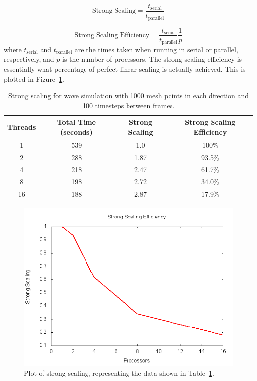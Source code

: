 \documentclass[12pt]{article}
\begin{document}
\begin{equation}
\mathrm{Strong \; Scaling} = \frac{t_{\mathrm{serial}}}{t_{\mathrm{parallel}}}
\label{strongscale}
\end{equation}

\begin{equation}
\mathrm{Strong \; Scaling \; Efficiency} = \frac{t_{\mathrm{serial}}}{t_{\mathrm{parallel}}} \frac{1}{p}
\label{normss}
\end{equation}
where $t_{\mathrm{serial}}$ and $t_{\mathrm{parallel}}$ are the times taken when running in serial or parallel, respectively, and $p$ is the number of processors. The strong scaling efficiency is essentially what percentage of perfect linear scaling is actually achieved. This is plotted in Figure~\ref{ssplot}.

\begin{table}[h]
	\begin{center}
		\begin{tabular}{|c c c c|}
			\hline
			Threads & Total Time (seconds) & Strong Scaling & Strong Scaling Efficiency \\ \hline
			1 & 539 & 1.0  & 100\% \\ \hline
			2 & 288 & 1.87 &  93.5\% \\ \hline
			4 & 218 &  2.47&  61.7\%  \\ \hline
			8 & 198 &  2.72&  34.0\%  \\ \hline
			16 & 188 &  2.87& 17.9\%   \\ \hline
		\end{tabular}
		\caption{Strong scaling for wave simulation with 1000 mesh points in each direction and 100 timesteps between frames.}
		\label{sstable}
	\end{center}
\end{table}

		\begin{figure}[h]
			\begin{center}
				\includegraphics[width=0.6\columnwidth]{ssplot}
				\caption{Plot of strong scaling, representing the data shown in Table~\ref{sstable}.}
				\label{ssplot}
			\end{center}
		\end{figure}
\end{document}
